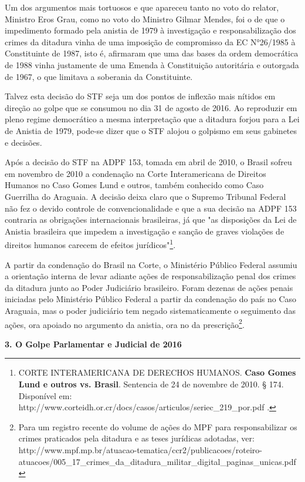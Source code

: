 Um dos argumentos mais tortuosos e que apareceu tanto no voto do
relator, Ministro Eros Grau, como no voto do Ministro Gilmar Mendes, foi
o de que o impedimento formado pela anistia de 1979 à investigação e
responsabilização dos crimes da ditadura vinha de uma imposição de
compromisso da EC N°26/1985 à Constituinte de 1987, isto é, afirmaram
que uma das bases da ordem democrática de 1988 vinha justamente de uma
Emenda à Constituição autoritária e outorgada de 1967, o que limitava a
soberania da Constituinte.

Talvez esta decisão do STF seja um dos pontos de inflexão mais nítidos
em direção ao golpe que se consumou no dia 31 de agosto de 2016. Ao
reproduzir em pleno regime democrático a mesma interpretação que a
ditadura forjou para a Lei de Anistia de 1979, pode-se dizer que o STF
alojou o golpismo em seus gabinetes e decisões.

Após a decisão do STF na ADPF 153, tomada em abril de 2010, o Brasil
sofreu em novembro de 2010 a condenação na Corte Interamericana de
Direitos Humanos no Caso Gomes Lund e outros, também conhecido como Caso
Guerrilha do Araguaia. A decisão deixa claro que o Supremo Tribunal
Federal não fez o devido controle de convencionalidade e que a sua
decisão na ADPF 153 contraria as obrigações internacionais brasileiras,
já que "as disposições da Lei de Anistia brasileira que impedem a
investigação e sanção de graves violações de direitos humanos carecem de
efeitos jurídicos"\footnote{CORTE INTERAMERICANA DE DERECHOS HUMANOS.
  \textbf{Caso Gomes Lund e outros vs. Brasil}. Sentencia de 24 de
  novembre de 2010. § 174. Disponível em:
  http://www.corteidh.or.cr/docs/casos/articulos/seriec\_219\_por.pdf .}.

A partir da condenação do Brasil na Corte, o Ministério Público Federal
assumiu a orientação interna de levar adiante ações de responsabilização
penal dos crimes da ditadura junto ao Poder Judiciário brasileiro. Foram
dezenas de ações penais iniciadas pelo Ministério Público Federal a
partir da condenação do país no Caso Araguaia, mas o poder judiciário
tem negado sistematicamente o seguimento das ações, ora apoiado no
argumento da anistia, ora no da prescrição\footnote{Para um registro
  recente do volume de ações do MPF para responsabilizar os crimes
  praticados pela ditadura e as teses jurídicas adotadas, ver:
  http://www.mpf.mp.br/atuacao-tematica/ccr2/publicacoes/roteiro-atuacoes/005\_17\_crimes\_da\_ditadura\_militar\_digital\_paginas\_unicas.pdf}.

\textbf{3. O Golpe Parlamentar e Judicial de 2016}

